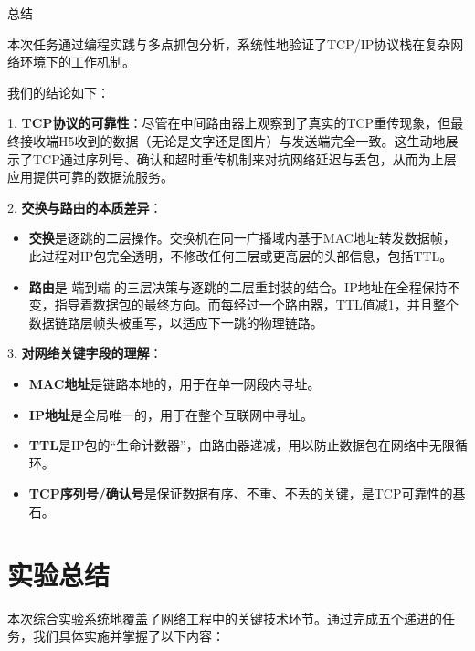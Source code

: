 \documentclass[12pt, a4paper]{article}
\begin{document}
总结

本次任务通过编程实践与多点抓包分析，系统性地验证了TCP/IP协议栈在复杂网络环境下的工作机制。

我们的结论如下：

1. \textbf{TCP协议的可靠性}：尽管在中间路由器上观察到了真实的TCP重传现象，但最终接收端H5收到的数据（无论是文字还是图片）与发送端完全一致。这生动地展示了TCP通过序列号、确认和超时重传机制来对抗网络延迟与丢包，从而为上层应用提供可靠的数据流服务。

2. \textbf{交换与路由的本质差异}：
    \begin{itemize}
        \item \textbf{交换}是逐跳的二层操作。交换机在同一广播域内基于MAC地址转发数据帧，此过程对IP包完全透明，不修改任何三层或更高层的头部信息，包括TTL。
        \item \textbf{路由}是 端到端 的三层决策与逐跳的二层重封装的结合。IP地址在全程保持不变，指导着数据包的最终方向。而每经过一个路由器，TTL值减1，并且整个数据链路层帧头被重写，以适应下一跳的物理链路。
    \end{itemize}

3. \textbf{对网络关键字段的理解}：
    \begin{itemize}
        \item \textbf{MAC地址}是链路本地的，用于在单一网段内寻址。
        \item \textbf{IP地址}是全局唯一的，用于在整个互联网中寻址。
        \item \textbf{TTL}是IP包的“生命计数器”，由路由器递减，用以防止数据包在网络中无限循环。
        \item \textbf{TCP序列号/确认号}是保证数据有序、不重、不丢的关键，是TCP可靠性的基石。
    \end{itemize}

\newpage
\section{实验总结}

本次综合实验系统地覆盖了网络工程中的关键技术环节。通过完成五个递进的任务，我们具体实施并掌握了以下内容：
\end{document}

